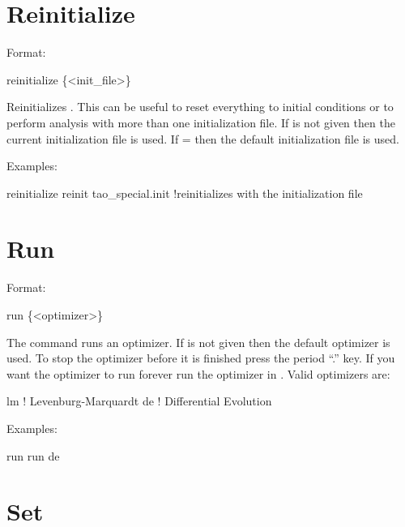 \section{Reinitialize}
\label{s:reinit}

Format:
\begin{example}
  reinitialize \{<init_file>\}
\end{example}

\vskip 0.2in Reinitializes \tao. This can be useful to reset everything to
initial conditions or to perform analysis with more than one initialization file.
If  is not given then 
the current initialization file is used. If  =  then
the default initialization file  is used.

Examples:
\begin{example}
  reinitialize 
  reinit tao_special.init !reinitializes \tao with the initialization file 
\end{example}


\section{Run}
\label{s:run}

Format:
\begin{example}
  run \{<optimizer>\}
\end{example}

\vskip 0.2in The  command runs an optimizer. If
 is not given then the default optimizer is used. To
stop the optimizer before it is finished press the period ``.''
key. If you want the optimizer to run forever run the optimizer in
. Valid optimizers are:
\begin{example}
  lm            ! Levenburg-Marquardt
  de            ! Differential Evolution
\end{example}

Examples:
\begin{example}
  run 
  run de
\end{example}

\section{Set}
\label{s:set}

